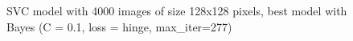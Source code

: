 \documentclass{article}
\begin{document}
\begin{figure}[!ht]
  \centering
  \qquad
  \caption{SVC model with 4000 images of size 128x128 pixels, best model with Bayes (C = 0.1,  loss = hinge, max\_iter=277)}
  \label{fig:SVC_4000_128x128_bayes}
\end{figure}
\end{document}
